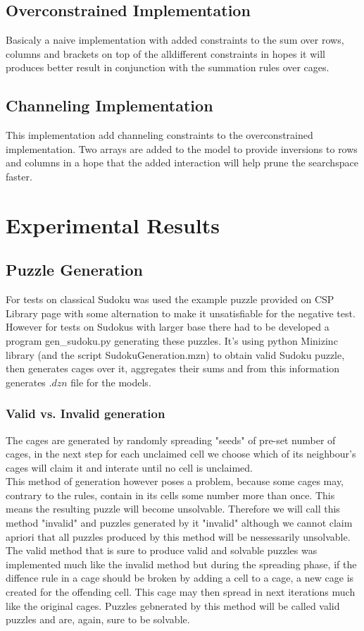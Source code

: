 \documentclass[10pt,a4paper,oneside]{article}
\begin{document}
\subsection{Overconstrained Implementation}
Basicaly a naive implementation with added constraints to the sum over rows, columns and brackets on top of the alldifferent constraints in hopes it will produces better result in conjunction with the summation rules over cages. 
\subsection{Channeling Implementation}
This implementation add channeling constraints to the overconstrained implementation. Two arrays are added to the model to provide inversions to rows and columns in a hope that the added interaction will help prune the searchspace faster.
\section{Experimental Results}
\subsection{Puzzle Generation}
For tests on classical Sudoku was used the example puzzle provided on CSP Library page with some alternation to make it unsatisfiable for the negative test.\\
However for tests on Sudokus with larger base there had to be developed a program gen\_sudoku.py generating these puzzles. It's using python Minizinc library (and the script SudokuGeneration.mzn) to obtain valid Sudoku puzzle, then generates cages over it, aggregates their sums and from this information generates $.dzn$ file for the models. 
\subsubsection{Valid vs. Invalid generation}
The cages are generated by randomly spreading "seeds" of pre-set number of cages, in the next step for each unclaimed cell we choose which of its neighbour's cages will claim it and interate until no cell is unclaimed.\\ 
This method of generation however poses a problem, because some cages may, contrary to the rules, contain in its cells some number more than once. This means the resulting puzzle will become unsolvable. Therefore we will call this method "invalid" and puzzles generated by it "invalid" although we cannot claim apriori that all puzzles produced by this method will be nessessarily unsolvable.\\
The valid method that is sure to produce valid and solvable puzzles was implemented much like the invalid method but during the spreading phase, if the diffence rule in a cage should be broken by adding a cell to a cage, a new cage is created for the offending cell. This cage may then spread in next iterations much like the original cages.
Puzzles gebnerated by this method will be called valid puzzles and are, again, sure to be solvable.     
\end{document}
